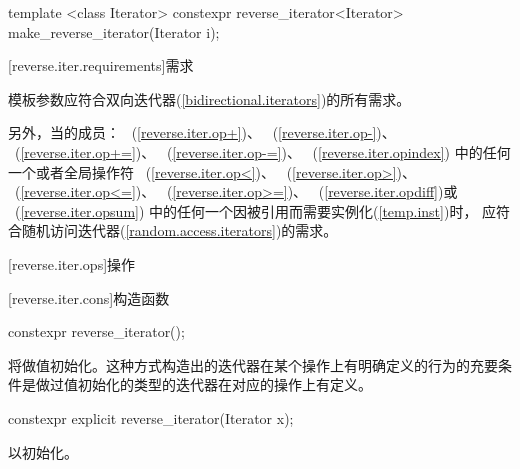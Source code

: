 \begin{codeblock}
{  template <class Iterator>
    constexpr reverse_iterator<Iterator> make_reverse_iterator(Iterator i);      
}
\end{codeblock}

[reverse.iter.requirements]{需求}

\pnum
模板参数应符合双向迭代器(\ref{bidirectional.iterators})的所有需求。

\pnum
另外，当的成员：
~(\ref{reverse.iter.op+})、
~(\ref{reverse.iter.op-})、
~(\ref{reverse.iter.op+=})、
~(\ref{reverse.iter.op-=})、
~(\ref{reverse.iter.opindex})
中的任何一个或者全局操作符
~(\ref{reverse.iter.op<})、
~(\ref{reverse.iter.op>})、\\
~(\ref{reverse.iter.op<=})、
~(\ref{reverse.iter.op>=})、
~(\ref{reverse.iter.opdiff})或
~(\ref{reverse.iter.opsum})
中的任何一个因被引用而需要实例化(\ref{temp.inst})时，
应符合随机访问迭代器(\ref{random.access.iterators})的需求。

[reverse.iter.ops]{操作}

[reverse.iter.cons]{构造函数}

%
\begin{itemdecl}
constexpr reverse_iterator();
\end{itemdecl}

\begin{itemdescr}
\pnum
\effects
将做值初始化。这种方式构造出的迭代器在某个操作上有明确定义的行为的充要条件是做过值初始化的类型的迭代器在对应的操作上有定义。
\end{itemdescr}

%

\begin{itemdecl}
constexpr explicit reverse_iterator(Iterator x);
\end{itemdecl}

\begin{itemdescr}
\pnum
\effects
以初始化。
\end{itemdescr}

%

